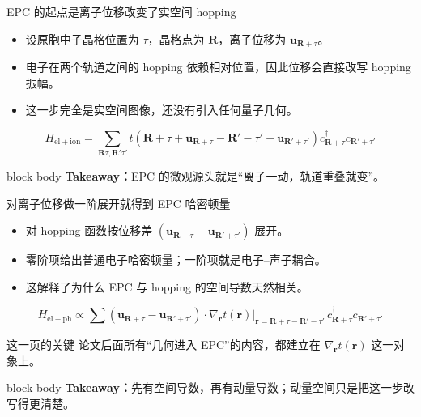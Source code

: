 \documentclass[aspectratio=169,11pt,UTF8]{ctexbeamer}
\newcommand{\takeaway}[1]{%
  \vfill
  \begin{beamercolorbox}[wd=\textwidth,sep=0.7ex,rounded=true]{block body}
    \small\textbf{Takeaway：}#1
  \end{beamercolorbox}
}
\begin{document}
\begin{frame}{EPC 的起点是离子位移改变了实空间 hopping}
  \begin{itemize}
    \item 设原胞中子晶格位置为 $\tau$，晶格点为 $\mathbf{R}$，离子位移为 $\mathbf{u}_{\mathbf{R}+\tau}$。
    \item 电子在两个轨道之间的 hopping 依赖相对位置，因此位移会直接改写 hopping 振幅。
    \item 这一步完全是实空间图像，还没有引入任何量子几何。
  \end{itemize}
  \begin{equation*}
    H_{\mathrm{el+ion}} =
    \sum_{\mathbf{R}\tau,\mathbf{R}'\tau'}
    t(\mathbf{R}+\tau+\mathbf{u}_{\mathbf{R}+\tau}-\mathbf{R}'-\tau'-\mathbf{u}_{\mathbf{R}'+\tau'})
    c^{\dagger}_{\mathbf{R}+\tau} c_{\mathbf{R}'+\tau'}
  \end{equation*}
  \takeaway{EPC 的微观源头就是“离子一动，轨道重叠就变”。}
\end{frame}

\begin{frame}{对离子位移做一阶展开就得到 EPC 哈密顿量}
  \begin{itemize}
    \item 对 hopping 函数按位移差 $(\mathbf{u}_{\mathbf{R}+\tau}-\mathbf{u}_{\mathbf{R}'+\tau'})$ 展开。
    \item 零阶项给出普通电子哈密顿量；一阶项就是电子--声子耦合。
    \item 这解释了为什么 EPC 与 hopping 的空间导数天然相关。
  \end{itemize}
  \begin{equation*}
    H_{\mathrm{el-ph}}
    \propto
    \sum
    (\mathbf{u}_{\mathbf{R}+\tau}-\mathbf{u}_{\mathbf{R}'+\tau'})
    \cdot
    \nabla_{\mathbf{r}} t(\mathbf{r})\big|_{\mathbf{r}=\mathbf{R}+\tau-\mathbf{R}'-\tau'}
    \,
    c^{\dagger}_{\mathbf{R}+\tau} c_{\mathbf{R}'+\tau'}
  \end{equation*}
  \begin{block}{这一页的关键}
    论文后面所有“几何进入 EPC”的内容，都建立在 $\nabla_{\mathbf{r}} t(\mathbf{r})$ 这一对象上。
  \end{block}
  \takeaway{先有空间导数，再有动量导数；动量空间只是把这一步改写得更清楚。}
\end{frame}
\end{document}
